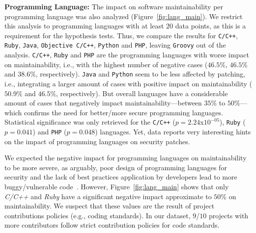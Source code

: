 \documentclass[smallextended]{svjour3}       %
\begin{document}
\textbf{Programming Language:} The impact on software maintainability per programming 
language was also analyzed (Figure~\ref{fig:lang_main}). We restrict 
this analysis to programming languages with at least $20$ data points, as this 
is a requirement for the hypothesis tests. Thus, we compare the results for 
\texttt{C/C++}, \texttt{Ruby}, \texttt{Java}, \texttt{Objective C/C++}, 
\texttt{Python} and \texttt{PHP}, leaving \texttt{Groovy} out of the analysis.
\texttt{C/C++}, \texttt{Ruby} and 
\texttt{PHP} are the programming languages with worse 
impact on maintainability, i.e., with the highest number of negative cases ($46.5\%$, $46.5\%$ 
and $38.6\%$, respectively). \texttt{Java} and \texttt{Python} 
seem to be less affected by patching, i.e., integrating a larger amount of cases with positive 
impact on maintainability ($50.9\%$ and $46.5\%$, respectively). But overall 
languages have a considerable amount of cases that negatively impact maintainability---between $35\%$ to $50\%$---which 
confirms the need for better/more secure programming languages. 
Statistical significance was only retrieved for the \texttt{C/C++} 
($p = 2.24$x$10^{-05}$), \texttt{Ruby} ($p = 0.041$) and \texttt{PHP} 
($p = 0.048$) languages. Yet, data reports very interesting hints on the impact 
of programming languages on security patches.

We expected the negative impact for programming languages on
maintainability to be more severe, as arguably, poor design of programming
languages for security and the lack of best practices application by developers lead to more buggy/vulnerable
code~\cite{Ray:2017:LSP:3144574.3126905,2019arXiv190110220B}. However,
Figure~\ref{fig:lang_main} shows that only \emph{C/C++} and \emph{Ruby} have 
a significant negative impact approximate to $50\%$ on 
maintainability. We suspect that these values are
the result of project contributions policies (e.g., coding standards). In our dataset, 
$9$/$10$ projects with more contributors follow strict contribution 
policies for code standards. 
\end{document}
